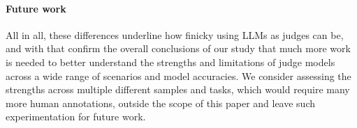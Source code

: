 


\paragraph{Future work}
All in all, these differences underline how finicky using LLMs as judges can be, and with that confirm the overall conclusions of our study that much more work is needed to better understand the strengths and limitations of judge models across a wide range of scenarios and model accuracies.
We consider assessing the strengths across multiple different samples and tasks, which would require many more human annotations, outside the scope of this paper and leave such experimentation for future work.
